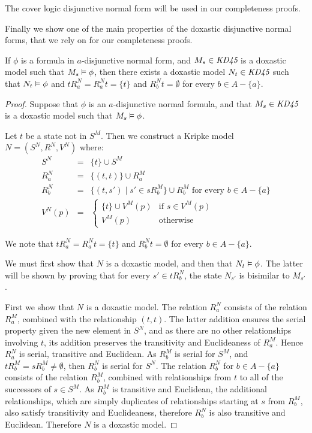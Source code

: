 The cover logic disjunctive normal form will be used in our completeness proofs.

Finally we show one of the main properties of the doxastic disjunctive normal
forms, that we rely on for our completeness proofs.

\begin{lemma}\label{kd45-successors}
If $\phi$ is a formula in $a$-disjunctive normal form, and $M_s \in \textit{KD45}$ is
a doxastic model such that $M_s \vDash \phi$, then there exists a doxastic
model $N_t \in \textit{KD45}$ such that $N_t \vDash \phi$ and $tR^N_a = R^N_at =
\{t\}$ and $R^N_bt = \emptyset$ for every $b \in A - \{a\}$.
\end{lemma}

\begin{proof}
Suppose that $\phi$ is an $a$-disjunctive normal formula, and that $M_s \in
\textit{KD45}$ is a doxastic model such that $M_s \vDash \phi$. 

Let $t$ be a state not in $S^M$. Then we construct a Kripke model $N = (S^N,
R^N, V^N)$ where:
\begin{eqnarray*}
S^N &=& \{t\} \cup S^M\\
R^N_a &=& \{(t, t)\} \cup R^M_a\\
R^N_b &=& \{(t, s') \mid s' \in sR^M_b\} \cup R^M_b \text{ for every $b \in A -
\{a\}$}\\
V^N(p) &=& \begin{cases}
\{t\} \cup V^M(p) & \text{if $s \in V^M(p)$}\\
V^M(p) & \text{otherwise}
\end{cases}
\end{eqnarray*}

We note that $tR^N_a = R^N_at = \{t\}$ and $R^N_bt = \emptyset$ for every $b
\in A - \{a\}$.

We must first show that $N$ is a doxastic model, and then that $N_t \vDash
\phi$. The latter will be shown by proving that for every $s' \in tR^N_b$, the
state $N_{s'}$ is bisimilar to $M_{s'}$.

First we show that $N$ is a doxastic model. The relation $R^N_a$ consists of the
relation $R^M_a$, combined with the relationship $(t,t)$. The latter addition
ensures the serial property given the new element in $S^N$, and as there are no
other relationships involving $t$, its addition preserves the transitivity and
Euclideaness of $R^M_a$. Hence $R^N_a$ is serial, transitive and Euclidean.
As $R^M_b$ is serial for $S^M$, and $tR^M_b = sR^M_b \ne \emptyset$, then
$R^N_b$ is serial for $S^N$. The relation $R^N_b$ for $b \in A - \{a\}$ consists
of the relation $R^M_b$, combined with relationships from $t$ to all of the
successors of $s \in S^M$. As $R^M_b$ is transitive and Euclidean, the
additional relationships, which are simply duplicates of relationships starting
at $s$ from $R^M_b$, also satisfy transitivity and Euclideaness, therefore
$R^N_b$ is also transitive and Euclidean. Therefore $N$ is a doxastic model.


\end{proof}

